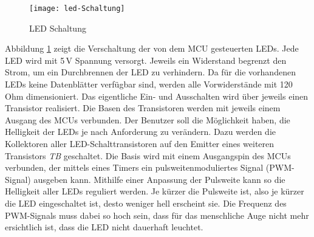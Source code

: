 \begin{figure}[h]
	\begin{center}
		\texttt{[image: led-Schaltung]}
		\caption{LED Schaltung}
		\label{fig:LED-Schaltung}
	\end{center}
\end{figure}
Abbildung \ref{fig:LED-Schaltung} zeigt die Verschaltung der von dem MCU gesteuerten LEDs. Jede LED wird mit 5\,V Spannung versorgt. Jeweils ein Widerstand begrenzt den Strom, um ein Durchbrennen der LED zu verhindern. Da für die vorhandenen LEDs keine Datenblätter verfügbar sind, werden alle Vorwiderstände mit 120\,Ohm dimensioniert. Das eigentliche Ein- und Ausschalten wird über jeweils einen Transistor realisiert. Die Basen des Transistoren werden mit jeweils einem Ausgang des MCUs verbunden. Der Benutzer soll die Möglichkeit haben, die Helligkeit der LEDs je nach Anforderung zu verändern. Dazu werden die Kollektoren aller LED-Schalttransistoren auf den Emitter eines weiteren Transistors \textit{TB} geschaltet. Die Basis wird mit einem Ausgangspin des MCUs verbunden, der mittels eines Timers ein pulsweitenmoduliertes Signal (PWM-Signal) ausgeben kann. Mithilfe einer Anpassung der Pulsweite kann so die Helligkeit aller LEDs reguliert werden. Je kürzer die Pulsweite ist, also je kürzer die LED eingeschaltet ist, desto weniger hell erscheint sie. Die Frequenz des PWM-Signals muss dabei so hoch sein, dass für das menschliche Auge nicht mehr ersichtlich ist, dass die LED nicht dauerhaft leuchtet.\\
%
